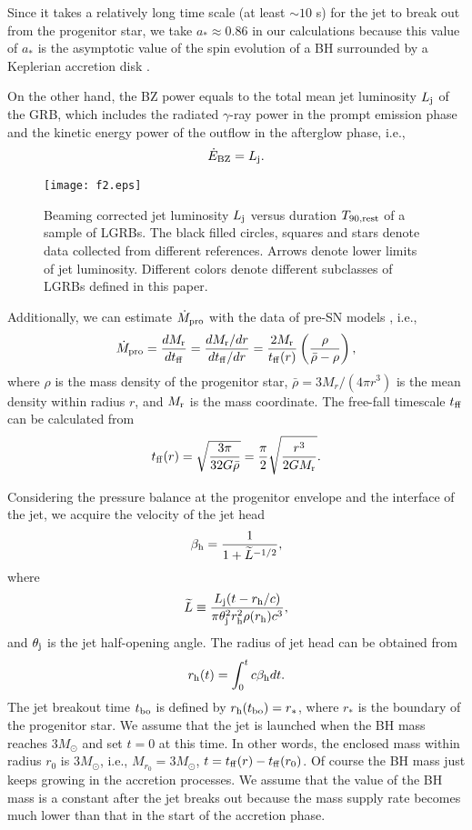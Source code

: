 \documentclass[twocolumn]{aastex6}
\def\beq{\begin{eqnarray}}
\def\eeq{\end{eqnarray}}
\begin{document}
Since it takes a relatively long time scale (at least $\sim 10$ s) for the jet to break out from the progenitor star, we take $a_*\approx0.86$ in our calculations because this value of $a_*$ is the asymptotic value of the spin evolution of a BH surrounded by a Keplerian accretion disk \citep[e.g.,][]{Song2015,Lei2017}.

On the other hand, the BZ power equals to the total mean jet luminosity $L_{\rm j}$ of the GRB, which includes the radiated $\gamma$-ray power in the prompt emission phase and the kinetic energy power of the outflow in the afterglow phase, i.e.,
\beq
\dot{E}_{\rm BZ}=L_{\rm j}.
\eeq

\begin{figure}
\texttt{[image: f2.eps]}
\caption{Beaming corrected jet luminosity $L_{\rm j}$ versus duration $T_{\rm 90,rest}$ of a sample of LGRBs. The black filled circles, squares and stars denote data collected from different references. Arrows denote lower limits of jet luminosity. Different colors denote different subclasses of LGRBs defined in this paper.}
\label{fig2}
\end{figure}

Additionally, we can estimate $\dot{M}_{\rm pro}$ with the data of pre-SN models \citep[e.g.,][]{Suwa2011,Woosley2012,Matsumoto2015}, i.e.,
\beq
\dot{M}_{\rm pro}= \frac{d M_{\rm r}}{dt_{\rm ff}}=\frac{dM_{\rm r}/dr}{dt_{\rm ff}/dr}=\frac{2M_{\rm r}}{t_{\rm ff}(r)} \left(\frac{\rho}{\bar{\rho}-\rho} \right),
\eeq
where $\rho$ is the mass density of the progenitor star, $\bar{\rho}=3M_{r}/(4\pi r^{3})$ is the mean density within radius $r$, and $M_{\rm r}$ is the mass coordinate. The free-fall timescale $t_{\rm ff}$ can be calculated from
\beq
t_{\rm ff}(r)=\sqrt{\frac{3\pi}{32G\bar{\rho}}}=\frac{\pi}{2}\sqrt{\frac{r^{3}}{2G M_{\rm r}}}.
\eeq

Considering the pressure balance at the progenitor envelope and the interface of the jet, we acquire the velocity of the jet head \citep[e.g.,][]{Matzner2003}
\beq
\beta_{\rm h}=\frac{1}{1+\widetilde{L}^{-1/2}},
\eeq
where
\beq
\widetilde{L}\equiv\frac{L_{\rm j}(t-r_{\rm h}/c)}{\pi\theta_{\rm j}^{2}r_{\rm h}^{2}\rho(r_{\rm h})c^3},
\eeq
and $\theta_{\rm j}$ is the jet half-opening angle. The radius of jet head can be obtained from
\beq
r_{\rm h}(t)=\int^{t}_{0}c\beta_{\rm h}dt.
\eeq
The jet breakout time $t_{\rm bo}$ is defined by $r_{\rm h}(t_{\rm bo})=r_{*}$, where $r_{*}$ is the boundary of the progenitor star. We assume that the jet is launched when the BH mass reaches 3$M_\odot$ and set $t=0$ at this time. In other words, the enclosed mass within radius $r_{0}$ is 3$M_\odot$, i.e., $M_{r_{0}}=3 M_{\odot}$, $t=t_{\rm ff}(r)-t_{\rm ff}(r_{0})$. Of course the BH mass just keeps growing in the accretion processes. We assume that the value of the BH mass is a constant after the jet breaks out because the mass supply rate becomes much lower than that in the start of the accretion phase.
\end{document}
